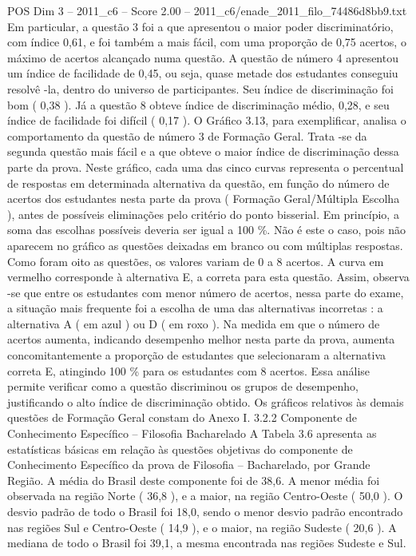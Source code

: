 \begin{textsample}{POS Dim 3 – 2011\_c6 – Score 2.00 – 2011\_c6/enade\_2011\_filo\_74486d8bb9.txt}
Em particular, a questão 3 foi a que apresentou o maior poder discriminatório, com índice 0,61, e foi também a mais fácil, com uma proporção de 0,75 acertos, o máximo de acertos alcançado numa questão.
A questão de número 4 apresentou um índice de facilidade de 0,45, ou seja, quase metade dos estudantes conseguiu resolvê -la, dentro do universo de participantes.
Seu índice de discriminação foi bom ( 0,38 ).
Já a questão 8 obteve índice de discriminação médio, 0,28, e seu índice de facilidade foi difícil ( 0,17 ).
O Gráfico 3.13, para exemplificar, analisa o comportamento da questão de número 3 de Formação Geral.
Trata -se da segunda questão mais fácil e a que obteve o maior índice de discriminação dessa parte da prova.
Neste gráfico, cada uma das cinco curvas representa o percentual de respostas em determinada alternativa da questão, em função do número de acertos dos estudantes nesta parte da prova ( Formação Geral/Múltipla Escolha ), antes de possíveis eliminações pelo critério do ponto bisserial.
Em princípio, a soma das escolhas possíveis deveria ser igual a 100 \%.
Não é este o caso, pois não aparecem no gráfico as questões deixadas em branco ou com múltiplas respostas.
Como foram oito as questões, os valores variam de 0 a 8 acertos.
A curva em vermelho corresponde à alternativa E, a correta para esta questão.
Assim, observa -se que entre os estudantes com menor número de acertos, nessa parte do exame, a situação mais frequente foi a escolha de uma das alternativas incorretas : a alternativa A ( em azul ) ou D ( em roxo ).
Na medida em que o número de acertos aumenta, indicando desempenho melhor nesta parte da prova, aumenta concomitantemente a proporção de estudantes que selecionaram a alternativa correta E, atingindo 100 \% para os estudantes com 8 acertos.
Essa análise permite verificar como a questão discriminou os grupos de desempenho, justificando o alto índice de discriminação obtido.
Os gráficos relativos às demais questões de Formação Geral constam do Anexo I. 3.2.2 Componente de Conhecimento Específico – Filosofia Bacharelado A Tabela 3.6 apresenta as estatísticas básicas em relação às questões objetivas do componente de Conhecimento Específico da prova de Filosofia – Bacharelado, por Grande Região.
A média do Brasil deste componente foi de 38,6.
A menor média foi observada na região Norte ( 36,8 ), e a maior, na região Centro-Oeste ( 50,0 ).
O desvio padrão de todo o Brasil foi 18,0, sendo o menor desvio padrão encontrado nas regiões Sul e Centro-Oeste ( 14,9 ), e o maior, na região Sudeste ( 20,6 ).
A mediana de todo o Brasil foi 39,1, a mesma encontrada nas regiões Sudeste e Sul.

\end{textsample}
